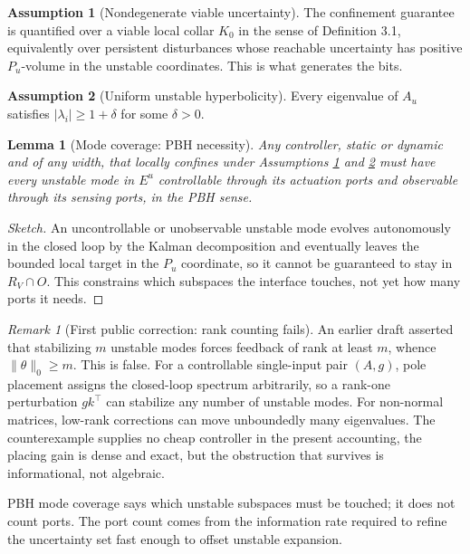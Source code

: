 \documentclass[11pt]{article}
\newtheorem{lemma}{Lemma}[section]
\theoremstyle{definition}
\newtheorem{assumption}{Assumption}[section]
\theoremstyle{remark}
\newtheorem{remark}{Remark}[section]
\newcommand{\RV}{R_V}
\newcommand{\Eu}{E^u}
\newcommand{\Pu}{P_u}
\newcommand{\Au}{A_u}
\begin{document}
\begin{assumption}[Nondegenerate viable uncertainty]\label{as:collar}
The confinement guarantee is quantified over a viable local collar $K_0$ in the sense of Definition 3.1, equivalently over persistent disturbances whose reachable uncertainty has positive $\Pu$-volume in the unstable coordinates. This is what generates the bits.
\end{assumption}

\begin{assumption}[Uniform unstable hyperbolicity]\label{as:hyp}
Every eigenvalue of $\Au$ satisfies $|\lambda_i|\ge 1+\delta$ for some $\delta>0$.
\end{assumption}

\begin{lemma}[Mode coverage: PBH necessity]
Any controller, static or dynamic and of any width, that locally confines under Assumptions \ref{as:collar} and \ref{as:hyp} must have every unstable mode in $\Eu$ controllable through its actuation ports and observable through its sensing ports, in the PBH sense.
\end{lemma}
\begin{proof}[Sketch]
An uncontrollable or unobservable unstable mode evolves autonomously in the closed loop by the Kalman decomposition and eventually leaves the bounded local target in the $\Pu$ coordinate, so it cannot be guaranteed to stay in $\RV\cap O$. This constrains which subspaces the interface touches, not yet how many ports it needs.
\end{proof}

\begin{remark}[First public correction: rank counting fails]
An earlier draft asserted that stabilizing $m$ unstable modes forces feedback of rank at least $m$, whence $\|\theta\|_0\ge m$. This is false. For a controllable single-input pair $(A,g)$, pole placement assigns the closed-loop spectrum arbitrarily, so a rank-one perturbation $gk^\top$ can stabilize any number of unstable modes. For non-normal matrices, low-rank corrections can move unboundedly many eigenvalues. The counterexample supplies no cheap controller in the present accounting, the placing gain is dense and exact, but the obstruction that survives is informational, not algebraic.
\end{remark}

PBH mode coverage says which unstable subspaces must be touched; it does not count ports. The port count comes from the information rate required to refine the uncertainty set fast enough to offset unstable expansion.
\end{document}
